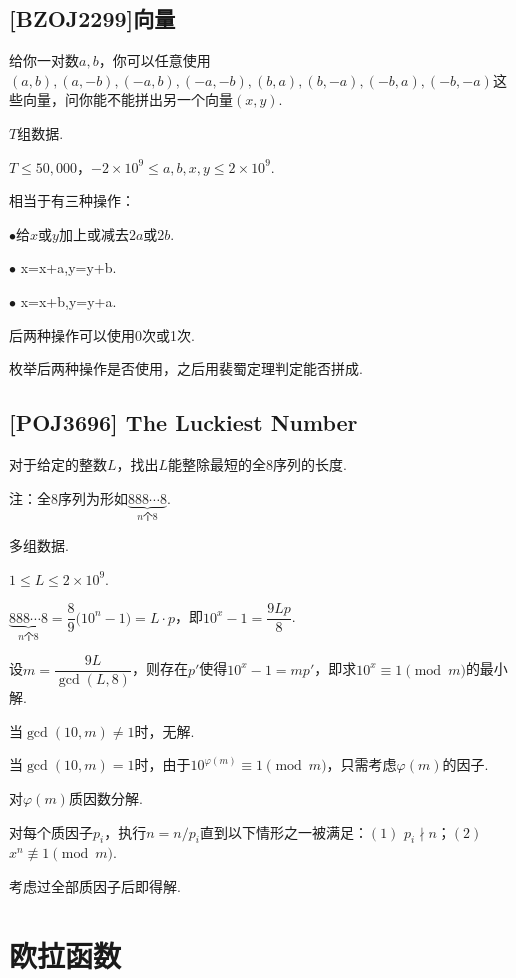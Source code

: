 \documentclass[a4paper]{article}
\def\leq{\leqslant}
\begin{document}
    \subsection{[BZOJ2299]向量}

    给你一对数$a,b$，\!\!你可以任意使用$(a,b),(a,-b),(-a,b),(-a,-b),(b,a),(b,-a),(-b,a),(-b,-a)$这些向量，\!\!问你能不能拼出另一个向量$(x,y)$.

    $T$组数据.

    $T\leq 50,000$，\!\!$-2\times {10}^9\leq a,b,x,y\leq 2\times {10}^9$.

    相当于有三种操作：\!\!

    $\bullet$给$x$或$y$加上或减去$2a$或$2b$.

    $\bullet$ {\ttfamily x=x+a,y=y+b}.

    $\bullet$ {\ttfamily x=x+b,y=y+a}.

    后两种操作可以使用0次或1次.

    枚举后两种操作是否使用，\!\!之后用裴蜀定理判定能否拼成.

    \subsection{[POJ3696] The Luckiest Number}

    对于给定的整数$L$，\!\!找出$L$能整除最短的全8序列的长度.

    注：\!\!全8序列为形如$\underbrace{888\cdots 8}_{n\text{个}8}$.

    多组数据.

    $1\leq L\leq 2\times {10}^9$.

    $\underbrace{888\cdots 8}_{n\text{个}8}=\dfrac{8}{9}\big({10}^n-1\big)=L\cdot p$，\!\!即${10}^x-1=\dfrac{9Lp}{8}$.

    设$m=\dfrac{9L}{\gcd(L,8)}$，\!\!则存在$p'$使得${10}^x-1=mp'$，\!\!即求${10}^x\equiv 1\pmod{m}$的最小解.

    当$\gcd(10,m)\neq 1$时，\!\!无解.

    当$\gcd(10,m)=1$时，\!\!由于${10}^{\varphi(m)}\equiv 1\pmod{m}$，\!\!只需考虑$\varphi(m)$的因子.

    对$\varphi(m)$质因数分解.

    对每个质因子$p_i$，\!\!执行$n=n/p_i$直到以下情形之一被满足：\!\!$(1)$ $p_i\nmid n$；\!\!$(2)$ $x^n\not\equiv 1\pmod{m}$.

    考虑过全部质因子后即得解.

    \section{欧拉函数}
\end{document}

